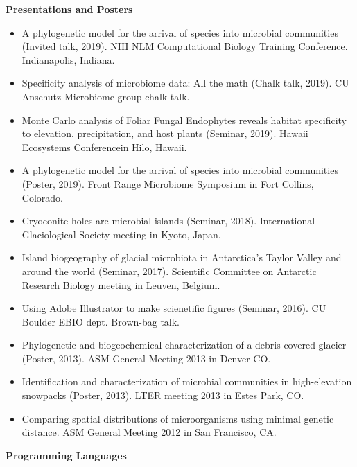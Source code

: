 \documentclass{article}
\begin{document}
\vspace{3mm}
{\large  \textbf{Presentations and Posters}}
\begin{itemize}[noitemsep,topsep=0pt, leftmargin=5mm]
  \item A phylogenetic model for the arrival of species into microbial communities (Invited talk, 2019). NIH NLM Computational Biology Training Conference. Indianapolis, Indiana.
  \item Specificity analysis of microbiome data: All the math (Chalk talk, 2019). CU Anschutz Microbiome group chalk talk.
  \item Monte Carlo analysis of Foliar Fungal Endophytes reveals habitat specificity to elevation, precipitation, and host plants (Seminar, 2019). Hawaii Ecosystems Conferencein  Hilo, Hawaii.
  \item A phylogenetic model for the arrival of species into microbial communities (Poster, 2019). Front Range Microbiome Symposium in Fort Collins, Colorado.
  \item Cryoconite holes are microbial islands (Seminar, 2018). International Glaciological Society meeting in Kyoto, Japan.
  \item Island biogeography of glacial microbiota in Antarctica’s Taylor Valley and around the world (Seminar, 2017). Scientific Committee on Antarctic Research Biology meeting in Leuven, Belgium.
  \item Using Adobe Illustrator to make scienetific figures (Seminar, 2016). CU Boulder EBIO dept. Brown-bag talk.
  \item Phylogenetic and biogeochemical characterization of a debris-covered glacier (Poster, 2013). ASM General Meeting 2013 in Denver CO.
  \item Identification and characterization of microbial communities in high-elevation snowpacks (Poster, 2013). LTER meeting 2013 in Estes Park, CO.
  \item Comparing spatial distributions of microorganisms using minimal genetic distance. ASM General Meeting 2012 in San Francisco, CA.
\end{itemize}
\vspace{3mm}\filbreak
{\large  \textbf{Programming Languages}}
\end{document}
